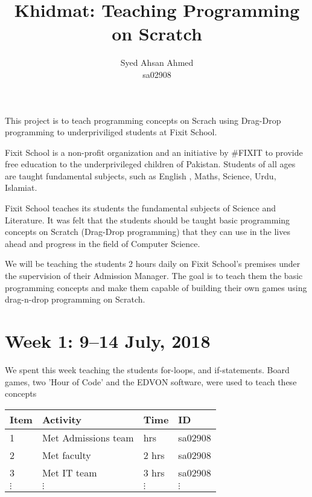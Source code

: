\documentclass{article}
\title {Khidmat: Teaching Programming on Scratch}
\author{
  Syed Ahsan Ahmed\\ sa02908
}
\date{}
\begin{document}
\maketitle

This project is to teach programming concepts on Scrach using Drag-Drop programming to underpriviliged students at Fixit School.

Fixit School is a non-profit organization and an initiative by #FIXIT to provide free education to the underprivileged children of Pakistan. Students of all ages are taught fundamental subjects, such as English , Maths, Science, Urdu, Islamiat. 

Fixit School teaches its students the fundamental subjects of Science and Literature. It was felt that the students should be taught basic programming concepts on Scratch (Drag-Drop programming) that they can use in the lives ahead and progress in the field of Computer Science.

We will be teaching the students 2 hours daily on Fixit School's premises under the supervision of their Admission Manager. The goal is to teach them the basic programming concepts and make them capable of building their own games using drag-n-drop programming on Scratch.

\newpage %
\section*{Week 1: 9--14 July, 2018}

We spent this week teaching the students for-loops, and if-statements. Board games, two 'Hour of Code' and the EDVON software, were used to teach these concepts

\begin{tabular}{|l|l|l|l|}
  \hline
  Item 	& Activity & Time & ID \\\hline\hline
  1	& Met Admissions team & hrs & sa02908 \\\hline
  2	& Met faculty & 2 hrs & sa02908 \\\hline
  3	& Met IT team & 3 hrs & sa02908 \\\hline
  $\vdots$ & $\vdots$ & $\vdots$ & $\vdots$ \\\hline
\end{tabular}
\end{document}
